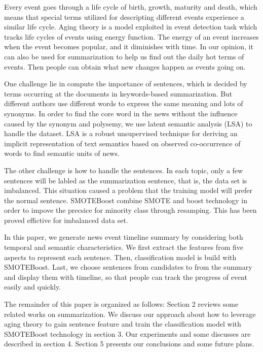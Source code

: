 \documentclass{llncs}
\begin{document}
Every event goes through a life cycle of birth, growth, maturity and death, which means that special terms utilized for descripting different events experience a similar life cycle. Aging theory \cite{2003-Chen-p47-59} is a model exploited in event detection task which tracks life cycles of events using energy function. The energy of an event increases when the event becomes popular, and it diminishes with time. In our opinion, it can also be used for summarization to help us find out the daily hot terms of events. Then people can obtain what new changes happen as events going on.

One challenge lie in compute the importance of sentences, which is decided by terms occurring at the documents in keywords-based summarization. But different authors use different words to express the same meaning and lots of synonyms. In order to find the core word in the news without the influence caused by the synonym and polysemy, we use latent semantic analysis (LSA) \cite{1990-Deerwester-p391-407} to handle the dataset. LSA is a robust unsupervised technique for deriving an implicit representation of text semantics based on observed co-occurrence of words to find semantic units of news.

The other challenge is how to handle the sentences. In each topic, only a few sentences will be labled as the summarization sentence, that is, the data set is imbalanced. This situation caused a problem that the training model will prefer the normal sentence. SMOTEBoost \cite{chawla2013smoteboost} combine SMOTE \cite{chawla2011smote} and boost technology in order to impove the precsice for minority class through resamping. This has been proved effictive for imbalanced data set. 

In this paper, we generate news event timeline summary by considering both temporal and semantic characteristics. We first extract the features from five aspects to represent each sentence. Then, classification model is build with SMOTEBoost. Last, we choose sentences from candidates to from the summary and display them with timeline, so that people can track the progress of event easily and quickly.

The remainder of this paper is organized as follows: Section 2 reviews some related works on summarization. We discuss our approach about how to leverage aging theory to gain sentence feature and train the classification model with SMOTEBoost technology in section 3. Our experiments and some discusses are described in section 4. Section 5 presents our conclusions and some future plans.
\end{document}
